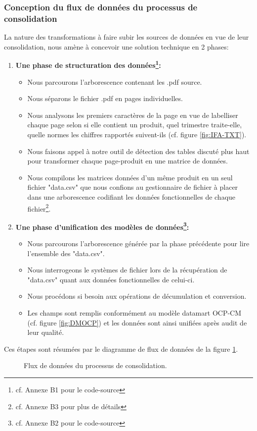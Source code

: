 	\subsubsection{Conception du flux de données du processus de consolidation}
	La nature des transformations à faire subir les sources de données en vue de leur consolidation, nous amène à concevoir une solution technique en 2 phases:
	\begin{enumerate}
	\item \textbf{Une phase de structuration des données\footnote{cf. Annexe B1 pour le code-source}:}
	\begin{itemize}
	\item Nous parcourons l'arborescence contenant les .pdf source.
	\item Nous séparons le fichier .pdf en pages individuelles.
	\item Nous analysons les premiers caractères de la page en vue de labelliser chaque page selon si elle contient un produit, quel trimestre traite-elle, quelle normes les chiffres rapportés suivent-ils (cf. figure \ref{fig:IFA-TXT}).
	\item Nous faisons appel à notre outil de détection des tables discuté plus haut pour transformer chaque page-produit en une matrice de données.
	\item Nous compilons les matrices données d'un même produit en un seul fichier "data.csv" que nous confions au gestionnaire de fichier à placer dans une arborescence codifiant les données fonctionnelles de chaque fichier\footnote{cf. Annexe B3 pour plus de détails}.
	\end{itemize}
	\item \textbf{Une phase d'unification des modèles de données\footnote{cf. Annexe B2 pour le code-source}:}
	\begin{itemize}
	\item Nous parcourons l'arborescence générée par la phase précédente pour lire l'ensemble des "data.csv".
	\item Nous interrogeons le systèmes de fichier lors de la récupération de "data.csv" quant aux données fonctionnelles de celui-ci.
	\item Nous procédons si besoin aux opérations de décumulation et conversion.
	\item Les champs sont remplis conformément au modèle datamart OCP-CM (cf. figure \ref{fig:DMOCP}) et les données sont ainsi unifiées après audit de leur qualité.
	\end{itemize}
	\end{enumerate}
	Ces étapes sont résumées par le diagramme de flux de données de la figure \ref{fig:DF}.
		\begin{figure}[h]
		    		\centering
		    		\caption{Flux de données du processus de consolidation.}
		    		\label{fig:DF}
		\end{figure}
